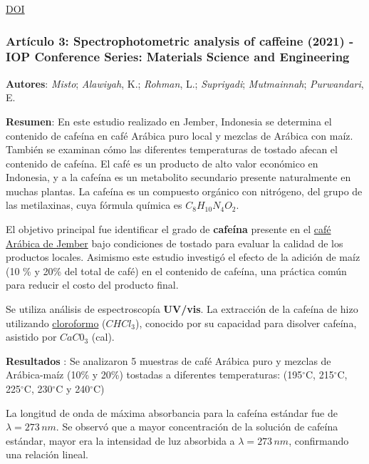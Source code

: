 \documentclass{article}
\begin{document}
\href{https://doi.org/10.1016/j.foodchem.2007.10.024}{DOI} \vspace{0.5cm}


\subsubsection{\textbf{Artículo 3:} \textcolor{Sun}{\textbf{Spectrophotometric analysis of caffeine (2021) - IOP Conference Series: Materials Science and Engineering}}} \vspace{0.5cm}

\textbf{Autores}: \textit{Misto}; \textit{Alawiyah}, K.; \textit{Rohman}, L.; \textit{Supriyadi}; \textit{Mutmainnah}; \textit{Purwandari}, E. \vspace{0.5cm}

\textbf{Resumen}:  En este estudio realizado en Jember, Indonesia se determina el contenido de cafeína en café Arábica puro local y mezclas de Arábica con maíz.  También se examinan cómo las diferentes temperaturas de tostado afecan el contenido de cafeína. El café es un producto de alto valor económico en Indonesia, y a la cafeína es un metabolito secundario presente naturalmente en muchas plantas. La cafeína es un compuesto orgánico con nitrógeno, del grupo de las metilaxinas, cuya fórmula química es $C_{8}H_{10}N_{4}O_{2}$.  \vspace{0.5cm}

El objetivo principal fue identificar el grado de \textbf{cafeína} presente en el \underline{café Arábica de Jember} bajo condiciones de tostado para evaluar la calidad de los productos locales. Asimismo este estudio investigó el efecto de la adición de maíz (10 \% y 20\% del total de café) en el contenido de cafeína, una práctica común para reducir el costo del producto final. \vspace{0.5cm}

Se utiliza   análisis de espectroscopía \textbf{UV/vis}. La extracción de la cafeína de hizo utilizando \underline{cloroformo} ($CHCl_{3}$), conocido por su capacidad para disolver cafeína, asistido por $CaC0_{3}$ (cal). 

\textbf{Resultados} : Se analizaron 5 muestras de café Arábica puro y mezclas de Arábica-maíz (10\% y 20\%) tostadas a diferentes temperaturas: (195$^{\circ}$C, 215$^{\circ}$C, 225$^{\circ}$C, 230$^{\circ}$C y 240$^{\circ}$C)\vspace{0.5cm}

La longitud de onda de máxima absorbancia para la cafeína estándar fue de $\lambda = 273\, nm$. Se observó que a mayor concentración de la solución de cafeína estándar, mayor era la intensidad de luz absorbida a $\lambda = 273\, nm$, confirmando una relación lineal.  \vspace{0.5cm}
\end{document}
